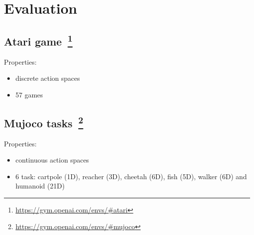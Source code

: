 \section{Evaluation}

\subsection{Atari game~\footnote{\url{https://gym.openai.com/envs/#atari}}}

Properties:
\begin{itemize}
\item discrete action spaces
\item 57 games
\end{itemize}

\subsection{Mujoco tasks~\footnote{\url{https://gym.openai.com/envs/#mujoco}}}

Properties:
\begin{itemize}
\item continuous action spaces
\item 6 task: cartpole (1D), reacher (3D), cheetah (6D), fish (5D), walker (6D) and humanoid (21D)
\end{itemize}



